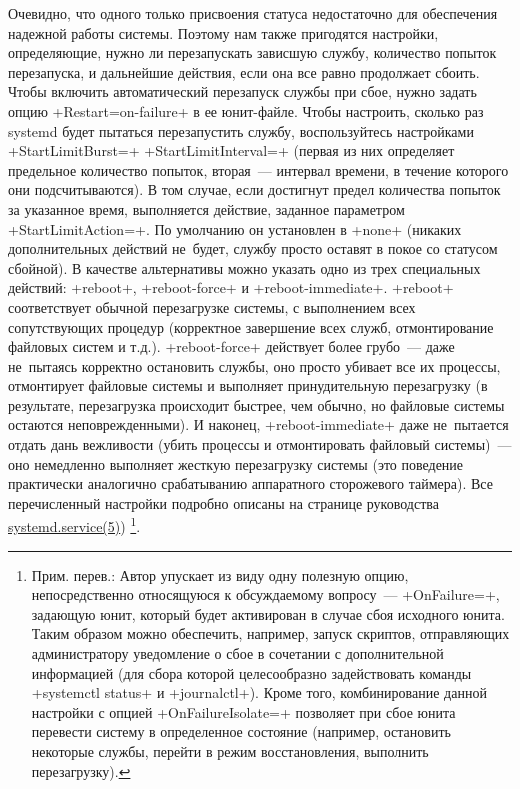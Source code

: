 \documentclass[10pt,oneside,a4paper]{article}
\begin{document}
Очевидно, что одного только присвоения статуса недостаточно для обеспечения
надежной работы системы. Поэтому нам также пригодятся настройки, определяющие,
нужно ли перезапускать зависшую службу, количество попыток перезапуска, и
дальнейшие действия, если она все равно продолжает сбоить. Чтобы включить
автоматический перезапуск службы при сбое, нужно задать опцию
+Restart=on-failure+ в ее юнит-файле. Чтобы настроить, сколько раз systemd будет
пытаться перезапустить службу, воспользуйтесь настройками +StartLimitBurst=+ 
+StartLimitInterval=+ (первая из них определяет предельное количество попыток,
вторая~--- интервал времени, в течение которого они подсчитываются). В том
случае, если достигнут предел количества попыток за указанное время, выполняется
действие, заданное параметром +StartLimitAction=+. По умолчанию он установлен в
+none+ (никаких дополнительных действий не~будет, службу просто оставят в покое со
статусом сбойной). В качестве альтернативы можно указать одно из трех
специальных действий: +reboot+, +reboot-force+ и +reboot-immediate+.
+reboot+ соответствует обычной перезагрузке системы, с выполнением всех
сопутствующих процедур (корректное завершение всех служб, отмонтирование
файловых систем и т.д.). +reboot-force+ действует более грубо~--- даже
не~пытаясь корректно остановить службы, оно просто убивает все их процессы,
отмонтирует файловые системы и выполняет принудительную перезагрузку (в
результате, перезагрузка происходит быстрее, чем обычно, но файловые системы
остаются неповрежденными). И наконец, +reboot-immediate+ даже не~пытается отдать
дань вежливости (убить процессы и отмонтировать файловый системы)~--- оно
немедленно выполняет жесткую перезагрузку системы (это поведение практически
аналогично срабатыванию аппаратного сторожевого таймера). Все перечисленный
настройки подробно описаны на странице руководства
\href{http://www.freedesktop.org/software/systemd/man/systemd.service.html}{systemd.service(5)})%
\footnote{Прим. перев.: Автор упускает из виду одну полезную опцию,
непосредственно относящуюся к обсуждаемому вопросу~--- +OnFailure=+, задающую
юнит, который будет активирован в случае сбоя исходного юнита. Таким образом
можно обеспечить, например, запуск скриптов, отправляющих администратору
уведомление о сбое в сочетании с дополнительной информацией (для сбора которой
целесообразно задействовать команды +systemctl status+ и +journalctl+). Кроме
того, комбинирование данной настройки с опцией +OnFailureIsolate=+ позволяет
при сбое юнита перевести систему в определенное состояние (например, остановить
некоторые службы, перейти в режим восстановления, выполнить перезагрузку).}.
\end{document}
